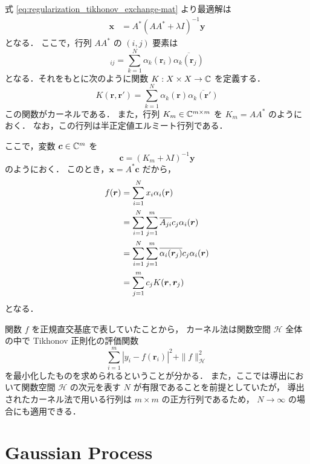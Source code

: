 式 \eqref{eq:regularization_tikhonov_exchange-mat} より最適解は
\begin{align}
    \bm{x} & = A^* (AA^* + \lambda I)^{-1} \bm{y}
\end{align}
となる．
ここで，行列 $AA^*$ の $(i, j)$ 要素は
\begin{equation}
    [AA^*]_{ij} = \sum_{k = 1}^{N} \alpha_k(\bm{r}_i) \overline{\alpha_k(\bm{r}_j)}
\end{equation}
となる．それをもとに次のように関数 $K : X \times X \to \mathbb{C}$ を定義する．
\begin{equation}
    K(\bm{r}, \bm{r}') = \sum_{k = 1}^{N} \alpha_k(\bm{r}) \overline{\alpha_k(\bm{r}')}
\end{equation}
この関数がカーネルである．
また，行列 $K_m \in \mathbb{C}^{m \times m}$ を
$K_m = AA^*$ のようにおく．
なお，この行列は半正定値エルミート行列である．

ここで，変数 $\bm{c} \in \mathbb{C}^m$ を
\begin{equation}
    \bm{c} = (K_m + \lambda I)^{-1} \bm{y}
    \label{eq:interp_kernel_tikhonov_coeff_c}
\end{equation}
のようにおく．
このとき，$\bm{x} = A^* \bm{c}$ だから，
\begin{align}
    f(\bm{r})
     & = \sum_{i = 1}^{N} x_i \alpha_i(\bm{r}) \notag                                                \\
     & = \sum_{i = 1}^{N} \sum_{j = 1}^{m} \overline{A_{ji}} c_j \alpha_i(\bm{r}) \notag             \\
     & = \sum_{i = 1}^{N} \sum_{j = 1}^{m} \overline{\alpha_i(\bm{r}_j)} c_j \alpha_i(\bm{r}) \notag \\
     & = \sum_{j = 1}^{m} c_j K(\bm{r}, \bm{r}_j)
\end{align}
となる．

関数 $f$ を正規直交基底で表していたことから，
カーネル法は関数空間 $\mathcal{H}$ 全体の中で Tikhonov 正則化の評価関数
\begin{equation}
    \sum_{i=1}^m \left|y_i - f(\bm{r}_i)\right|^2
    + \|f\|_{\mathcal{H}}^2
\end{equation}
を最小化したものを求められるということが分かる．
また，ここでは導出において関数空間 $\mathcal{H}$ の次元を表す $N$ が有限であることを前提としていたが，
導出されたカーネル法で用いる行列は $m \times m$ の正方行列であるため，
$N \to \infty$ の場合にも適用できる．

\section{Gaussian Process}\label{sec:regularization_kernel_gaussian-process}

